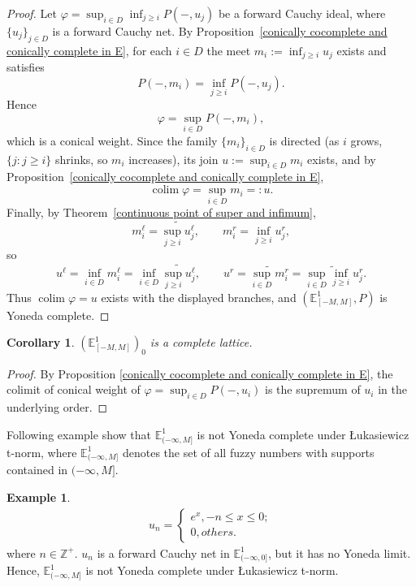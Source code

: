 \documentclass[preprint,3p,times]{elsarticle}
\theoremstyle{plain}
\newtheorem{cor}[thm]{Corollary}
\theoremstyle{definition}
\newtheorem{exmp}[thm]{Example}
\renewcommand{\phi}{\varphi}
\numberwithin{equation}{section}
\begin{document}
\begin{proof}
Let $\phi=\sup_{i\in D}\inf_{j\ge i}P(-,u_j)$ be a forward Cauchy ideal, where
$\{u_j\}_{j\in D}$ is a forward Cauchy net. By Proposition~\ref{conically cocomplete and conically complete in E}, for each
$i\in D$ the meet $m_i:=\inf_{j\ge i}u_j$ exists and satisfies
\[
P(-,m_i)=\inf_{j\ge i}P(-,u_j).
\]
Hence
\[
\phi=\sup_{i\in D}P(-,m_i),
\]
which is a conical weight. Since the family $\{m_i\}_{i\in D}$ is directed (as $i$
grows, $\{j:j\ge i\}$ shrinks, so $m_i$ increases), its join $u:=\sup_{i\in D}m_i$
exists, and by 
Proposition~\ref{conically cocomplete and conically complete in E},
\[
\operatorname{colim}\phi=\sup_{i\in D}m_i=:u.
\]
Finally, by Theorem~\ref{continuous point of super and infimum},
\[
m_i^\ell=\widetilde{\sup_{j\ge i}u_j^\ell},\qquad m_i^r=\inf_{j\ge i}u_j^r,
\]
so
\[
u^\ell=\inf_{i\in D}m_i^\ell=\inf_{i\in D}\widetilde{\sup_{j\ge i}u_j^\ell},
\qquad
u^r=\widetilde{\sup_{i\in D}m_i^r}=\widetilde{\sup_{i\in D}\inf_{j\ge i}u_j^r}.
\]
Thus $\operatorname{colim}\phi=u$ exists with the displayed branches, and
$(\mathbb{E}^1_{[-M,M]},P)$ is Yoneda complete.
\end{proof}


\begin{cor}\label{complete lattice}
	\((\mathbb{E}^1_{[-M,M]})_0 \) is a complete lattice.
\end{cor}
\begin{proof}
	By  Proposition \ref{conically cocomplete and conically complete in E}, the colimit of conical weight of \(\phi=\sup_{i\in D} P(-,u_i)\) is the supremum of \(u_i\) in  the underlying order. 
\end{proof}
Following example show that \(\mathbb{E}^1_{(-\infty,M]}\) is not Yoneda complete under Łukasiewicz t-norm, where \(\mathbb{E}^1_{(-\infty,M]}\) denotes the set of all fuzzy numbers with supports contained in \((-\infty,M]\).
\begin{exmp}
    \begin{align*}
        u_n=\begin{cases}
            e^x,-n \le x\le 0;\\
            0, others.
        \end{cases}
    \end{align*}
    where \(n\in \mathbb{Z}^+\).
    \(u_n\) is a forward Cauchy net in \(\mathbb{E}^1_{(-\infty,0]}\), but it has no Yoneda limit. Hence, \(\mathbb{E}^1_{(-\infty,M]}\) is not Yoneda complete under Łukasiewicz t-norm.
\end{exmp}
\end{document}
